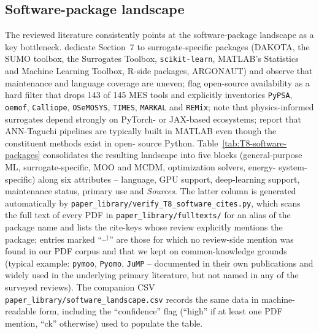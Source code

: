 \subsection{Software-package landscape}
\label{sec:software}

The reviewed literature consistently points at the software-package
landscape as a key bottleneck. \cite{Bhosekar2018} dedicate
Section~7 to surrogate-specific packages (DAKOTA, the SUMO
toolbox, the Surrogates Toolbox, \texttt{scikit-learn}, MATLAB's
Statistics and Machine Learning Toolbox, R-side packages, ARGONAUT)
and observe that maintenance and language coverage are uneven;
\cite{Klemm2021} flag open-source availability as a hard filter
that drops 143 of 145 MES tools and explicitly inventories
\texttt{PyPSA}, \texttt{oemof}, \texttt{Calliope},
\texttt{OSeMOSYS}, \texttt{TIMES}, \texttt{MARKAL} and
\texttt{REMix}; \cite{Mohammadi2024} note that physics-informed
surrogates depend strongly on PyTorch- or JAX-based ecosystems;
\cite{Etghani2025} report that ANN-Taguchi pipelines are typically
built in MATLAB even though the constituent methods exist in open-
source Python. Table~\ref{tab:T8-software-packages} consolidates
the resulting landscape into five blocks (general-purpose ML,
surrogate-specific, MOO and MCDM, optimization solvers, energy-
system-specific) along six attributes -- language, GPU support,
deep-learning support, maintenance status, primary use and
\emph{Sources}. The latter column is generated automatically by
\texttt{paper\_library/verify\_T8\_software\_cites.py}, which scans
the full text of every PDF in \texttt{paper\_library/fulltexts/} for
an alias of the package name and lists the cite-keys whose review
explicitly mentions the package; entries marked ``--$^\dagger$''
are those for which no review-side mention was found in our PDF
corpus and that we kept on common-knowledge grounds (typical
example: \texttt{pymoo}, \texttt{Pyomo}, \texttt{JuMP} -- documented
in their own publications and widely used in the underlying
primary literature, but not named in any of the surveyed reviews).
The companion CSV \texttt{paper\_library/software\_landscape.csv}
records the same data in machine-readable form, including the
``confidence'' flag (``high'' if at least one PDF mention, ``ck''
otherwise) used to populate the table.

